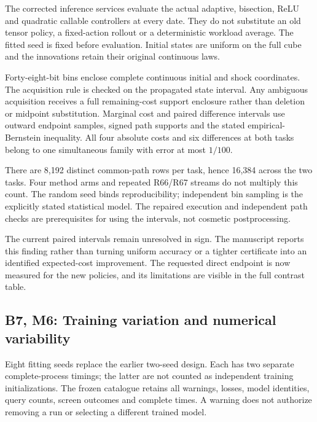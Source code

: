 The corrected inference services evaluate the actual adaptive,
bisection, ReLU and quadratic callable controllers at every date. They
do not substitute an old tensor policy, a fixed-action rollout or a
deterministic workload average. The fitted seed is fixed before
evaluation. Initial states are uniform on the full cube and the
innovations retain their original continuous laws.

Forty-eight-bit bins enclose complete continuous initial and shock
coordinates. The acquisition rule is checked on the propagated state
interval. Any ambiguous acquisition receives a full remaining-cost
support enclosure rather than deletion or midpoint substitution.
Marginal cost and paired difference intervals use outward endpoint
samples, signed path supports and the stated empirical-Bernstein
inequality. All four absolute costs and six differences at both tasks
belong to one simultaneous family with error at most \(1/100\).

There are 8,192 distinct common-path rows per task, hence 16,384 across
the two tasks. Four method arms and repeated R66/R67 streams do not
multiply this count. The random seed binds reproducibility; independent
bin sampling is the explicitly stated statistical model. The repaired
execution and independent path checks are prerequisites for using the
intervals, not cosmetic postprocessing.

The current paired intervals remain unresolved in sign. The manuscript
reports this finding rather than turning uniform accuracy or a tighter
certificate into an identified expected-cost improvement. The requested
direct endpoint is now measured for the new policies, and its
limitations are visible in the full contrast table.

\hypertarget{b7-m6-training-variation-and-numerical-variability}{%
\subsection{B7, M6: Training variation and numerical
variability}\label{b7-m6-training-variation-and-numerical-variability}}

Eight fitting seeds replace the earlier two-seed design. Each has two
separate complete-process timings; the latter are not counted as
independent training initializations. The frozen catalogue retains all
warnings, losses, model identities, query counts, screen outcomes and
complete times. A warning does not authorize removing a run or selecting
a different trained model.

